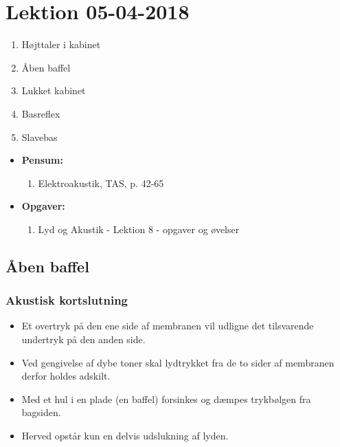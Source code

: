 \section{Lektion 05-04-2018}

\begin{enumerate}
	\item Højttaler i kabinet
	\item Åben baffel
	\item Lukket kabinet
	\item Basreflex
	\item Slavebas
\end{enumerate}

\begin{mdframed}[style=exampledefault]
	\begin{itemize}
		\item \textbf{Pensum:} 
		\begin{enumerate}
			\item Elektroakustik, TAS,  p. 42-65
		\end{enumerate}
		\item \textbf{Opgaver:} 
		\begin{enumerate}
			\item Lyd og Akustik - Lektion 8 - opgaver og øvelser
		\end{enumerate}
	\end{itemize}
\end{mdframed}

\subsection{Åben baffel}

\subsubsection{Akustisk kortslutning}
\begin{itemize}
	\item Et overtryk på den ene side af membranen vil udligne det tilsvarende undertryk på den anden side.
	\item Ved gengivelse af dybe toner skal lydtrykket fra de to sider af membranen derfor holdes adskilt.
	\item Med et hul i en plade (en baffel) forsinkes og
	dæmpes trykbølgen fra bagsiden.
	\item Herved opstår kun en delvis udslukning af lyden.
\end{itemize}

